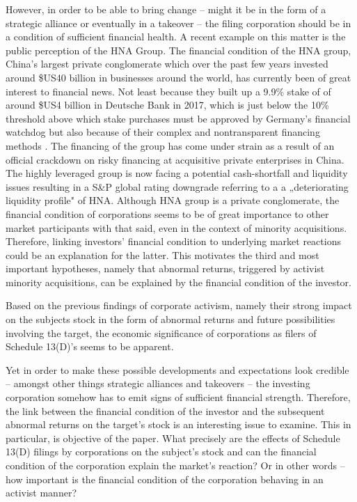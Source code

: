 \documentclass[12pt]{article}
\begin{document}
However, in order to be able to bring change -- might it be in the form of a strategic alliance or eventually in a takeover -- the filing corporation should be in a condition of sufficient financial health. 
A recent example on this matter is the public perception of the HNA Group. The financial condition of the HNA group, China's largest private conglomerate which over the past few years invested around \$US40 billion in businesses around the world, has currently been of great interest to financial news. Not least because they built up a 9.9\% stake of of around \$US4 billion in Deutsche Bank in 2017, which is just below the 10\% threshold above which stake purchases must be approved by Germany's financial watchdog but also because of their complex and nontransparent financing methods .
The financing of the group has come under strain as a result of an official crackdown on risky financing at acquisitive private enterprises in China. The highly leveraged group is now facing a potential cash-shortfall and liquidity issues resulting in a S\&P global rating downgrade referring to a a „deteriorating liquidity profile" of HNA. Although HNA group is a private conglomerate, the financial condition of corporations seems to be of great importance to other market participants with that said, even in the context of minority acquisitions. Therefore, linking investors' financial condition to  underlying market reactions could be an explanation for the latter. This motivates the third and most important hypotheses, namely that abnormal returns, triggered by activist minority acquisitions, can be explained by the financial condition of the investor. 


Based on the previous findings of corporate activism, namely their strong impact on the subjects stock in the form of abnormal returns and future possibilities involving the target, the economic significance of corporations as filers of Schedule 13(D)'s seems to be apparent.

Yet in order to make these possible developments and expectations look credible -- amongst other things strategic alliances and takeovers -- the investing corporation somehow has to emit signs of sufficient financial strength. Therefore, the link between the financial condition of the investor and the subsequent abnormal returns on the target's stock is an interesting issue to examine. This in particular, is objective of the paper. What precisely are the effects of Schedule 13(D) filings by corporations on the subject's stock and can the financial condition of the corporation explain the market's reaction? Or in other words -- how important is the financial condition of the corporation behaving in an activist manner? 
\end{document}
